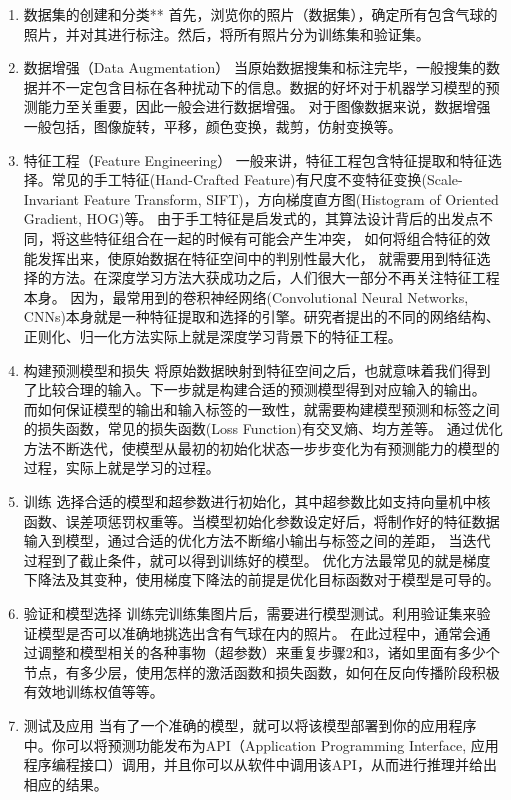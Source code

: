 \documentclass[10pt]{article}
\begin{document}
  \begin{enumerate}
    \item 数据集的创建和分类** 首先，浏览你的照片（数据集），确定所有包含气球的照片，并对其进行标注。然后，将所有照片分为训练集和验证集。
    
    \item 数据增强（Data Augmentation）
    当原始数据搜集和标注完毕，一般搜集的数据并不一定包含目标在各种扰动下的信息。数据的好坏对于机器学习模型的预测能力至关重要，因此一般会进行数据增强。
    对于图像数据来说，数据增强一般包括，图像旋转，平移，颜色变换，裁剪，仿射变换等。
    
    \item 特征工程（Feature Engineering）
    一般来讲，特征工程包含特征提取和特征选择。常见的手工特征(Hand-Crafted Feature)有尺度不变特征变换(Scale-Invariant Feature Transform, SIFT)，方向梯度直方图(Histogram of Oriented Gradient, HOG)等。
    由于手工特征是启发式的，其算法设计背后的出发点不同，将这些特征组合在一起的时候有可能会产生冲突，
    如何将组合特征的效能发挥出来，使原始数据在特征空间中的判别性最大化，
    就需要用到特征选择的方法。在深度学习方法大获成功之后，人们很大一部分不再关注特征工程本身。
    因为，最常用到的卷积神经网络(Convolutional Neural Networks, CNNs)本身就是一种特征提取和选择的引擎。研究者提出的不同的网络结构、正则化、归一化方法实际上就是深度学习背景下的特征工程。
    
    \item 构建预测模型和损失
    将原始数据映射到特征空间之后，也就意味着我们得到了比较合理的输入。下一步就是构建合适的预测模型得到对应输入的输出。
    而如何保证模型的输出和输入标签的一致性，就需要构建模型预测和标签之间的损失函数，常见的损失函数(Loss Function)有交叉熵、均方差等。
    通过优化方法不断迭代，使模型从最初的初始化状态一步步变化为有预测能力的模型的过程，实际上就是学习的过程。
    
    \item 训练
    选择合适的模型和超参数进行初始化，其中超参数比如支持向量机中核函数、误差项惩罚权重等。当模型初始化参数设定好后，将制作好的特征数据输入到模型，通过合适的优化方法不断缩小输出与标签之间的差距，
    当迭代过程到了截止条件，就可以得到训练好的模型。
    优化方法最常见的就是梯度下降法及其变种，使用梯度下降法的前提是优化目标函数对于模型是可导的。
    
    \item 验证和模型选择
    训练完训练集图片后，需要进行模型测试。利用验证集来验证模型是否可以准确地挑选出含有气球在内的照片。 	
    在此过程中，通常会通过调整和模型相关的各种事物（超参数）来重复步骤2和3，诸如里面有多少个节点，有多少层，使用怎样的激活函数和损失函数，如何在反向传播阶段积极有效地训练权值等等。
    
    \item 测试及应用
    当有了一个准确的模型，就可以将该模型部署到你的应用程序中。你可以将预测功能发布为API（Application Programming Interface, 应用程序编程接口）调用，并且你可以从软件中调用该API，从而进行推理并给出相应的结果。
    
  \end{enumerate}
\end{document}

